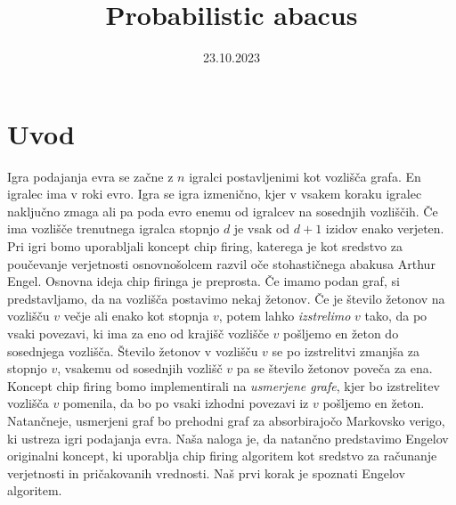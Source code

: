 \documentclass[twoside,11pt]{article}
\begin{document}



\date{23.10.2023}

\klasifikacija{~} 
\title{Probabilistic abacus}

\glava
\baselineskip=14.5pt

\smallskip

\section{Uvod}
Igra podajanja evra se začne z $n$ igralci postavljenimi kot vozlišča grafa. En igralec ima v roki evro. Igra se igra izmenično, kjer v vsakem koraku igralec naključno zmaga ali pa poda evro enemu od igralcev na sosednjih vozliščih. Če ima vozlišče trenutnega igralca stopnjo $d$ je vsak od $d + 1$ izidov enako verjeten. Pri igri bomo uporabljali koncept chip firing, katerega je kot sredstvo za poučevanje verjetnosti osnovnošolcem razvil oče stohastičnega abakusa Arthur Engel.
Osnovna ideja chip firinga je preprosta. Če imamo podan graf, si predstavljamo, da na vozlišča postavimo nekaj žetonov. Če je število žetonov na vozlišču $v$ večje ali enako kot stopnja $v$, potem lahko \emph{izstrelimo} $v$ tako, da po vsaki povezavi, ki ima za eno od krajišč vozlišče $v$ pošljemo en žeton do sosednjega vozlišča. Število žetonov v vozlišču $v$ se po izstrelitvi zmanjša za stopnjo $v$, vsakemu od sosednjih vozlišč $v$ pa se število žetonov poveča za ena. 
Koncept chip firing bomo implementirali na \emph{usmerjene grafe}, kjer bo izstrelitev vozlišča $v$ pomenila, da bo po vsaki izhodni povezavi iz $v$ pošljemo en žeton. Natančneje, usmerjeni graf bo prehodni graf za absorbirajočo Markovsko verigo, ki ustreza igri podajanja evra. Naša naloga je, da natančno predstavimo Engelov originalni koncept, ki uporablja chip firing algoritem kot sredstvo za računanje verjetnosti in pričakovanih vrednosti. Naš prvi korak je spoznati Engelov algoritem.
\end{document}
